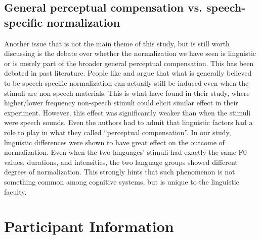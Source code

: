 \documentclass[12pt]{report}
\begin{document}
\begin{CJK}{UTF8}{bsmi}
\section{General perceptual compensation vs. speech-specific normalization}

Another issue that is not the main theme of this study, but is still worth discussing is the debate over whether the normalization we have seen is linguistic or is merely part of the broader general perceptual compensation. This has been debated in past literature. People like \cite{WatkinsMakin1994} and \cite{Zhangetal2022} argue that what is generally believed to be speech-specific normalization can actually still be induced even when the stimuli are non-speech materials. This is what \citeauthor{Zhangetal2022} have found in their study, where higher/lower frequency non-speech stimuli could elicit similar effect in their experiment. However, this effect was significantly weaker than when the stimuli were speech sounds. Even the authors had to admit that linguistic factors had a role to play in what they called ``perceptual compensation''. In our study, linguistic differences were shown to have great effect on the outcome of normalization. Even when the two languages' stimuli had exactly the same F0 values, durations, and intensities, the two language groups showed different degrees of normalization. This strongly hints that such phenomenon is not something common among cognitive systems, but is unique to the linguistic faculty.




\pagebreak




\pagebreak
\appendix



\pagebreak
\chapter{Participant Information}\label{Appendix:ParticipantInfo}


\end{CJK}
\end{document}
